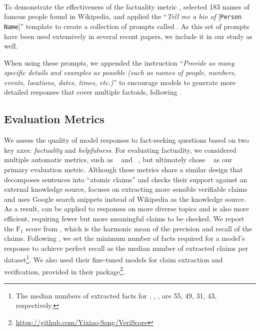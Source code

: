 \paragraph{\bio} To demonstrate the effectiveness of the factuality metric \fs, \citet{min-etal-2023-factscore} selected 183 names of famous people found in Wikipedia, and applied the ``\textit{Tell me a bio of} [\texttt{Person Name}]'' template to create a collection of prompts called \bio. As this set of prompts have been used extensively in several recent papers, we include it in our study as well.

When using these prompts, we appended the instruction ``\textit{Provide as many specific details and examples as possible (such as names of people, numbers, events, locations, dates, times, etc.)}'' to encourage models to generate more detailed responses that cover multiple factoids, following \citet{wei2024longform}.


\subsection{Evaluation Metrics} 

We assess the quality of model responses to fact-seeking questions based on two key axes: \textit{factuality} and \textit{helpfulness}.
For evaluating factuality, we considered multiple automatic metrics, such as \fs~\citep{min-etal-2023-factscore} and \safe~\citep{wei2024longform}, but ultimately chose \vs~\citep{song-etal-2024-veriscore} as our primary evaluation metric. 
Although these metrics share a similar design that decomposes sentences into ``atomic claims'' and checks their support against an external knowledge source, \vs focuses on extracting more sensible verifiable claims and uses Google search snippets instead of Wikipedia as the knowledge source.
As a result, \vs can be applied to responses on more diverse topics and is also more efficient, requiring fewer but more meaningful claims to be checked. 
We report the F$_1$ score from \vs, which is the harmonic mean of the precision and recall of the claims. 
Following \citet{song-etal-2024-veriscore}, we set the minimum number of facts required for a model's response to achieve perfect recall as the median number of extracted claims per dataset\footnote{The median numbers of extracted facts for \lf, \fava, \alpaca, \bio are 55, 49, 31, 43, respectively.}. We also used their fine-tuned models for claim extraction and verification, provided in their package\footnote{\url{https://github.com/Yixiao-Song/VeriScore}}. 

